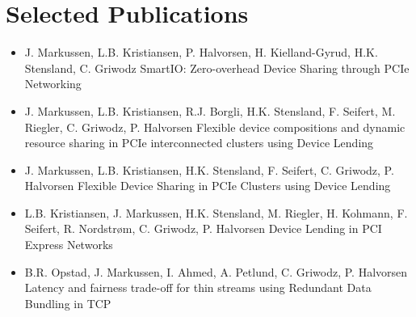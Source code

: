 \section{Selected Publications}
\begin{itemize}
    \item {}
		{J. Markussen, L.B. Kristiansen, P. Halvorsen, H. Kielland-Gyrud, H.K. Stensland, C. Griwodz}
		{SmartIO: Zero-overhead Device Sharing through PCIe Networking}

    \item {}
		{J. Markussen, L.B. Kristiansen, R.J. Borgli, H.K. Stensland, F. Seifert, M. Riegler, C. Griwodz, P. Halvorsen}
		{Flexible device compositions and dynamic resource sharing in PCIe interconnected clusters using Device Lending}

	\item {}
		{J. Markussen, L.B. Kristiansen, H.K. Stensland, F. Seifert, C. Griwodz, P. Halvorsen}
		{Flexible Device Sharing in PCIe Clusters using Device Lending}

    \item {}
		{L.B. Kristiansen, J. Markussen, H.K. Stensland, M. Riegler, H. Kohmann, F. Seifert, R. Nordstr{\o}m, C. Griwodz, P. Halvorsen}
		{Device Lending in PCI Express Networks}

    \item {}
		{B.R. Opstad, J. Markussen, I. Ahmed, A. Petlund, C. Griwodz, P. Halvorsen}
		{Latency and fairness trade-off for thin streams using Redundant Data Bundling in TCP}
\end{itemize}
